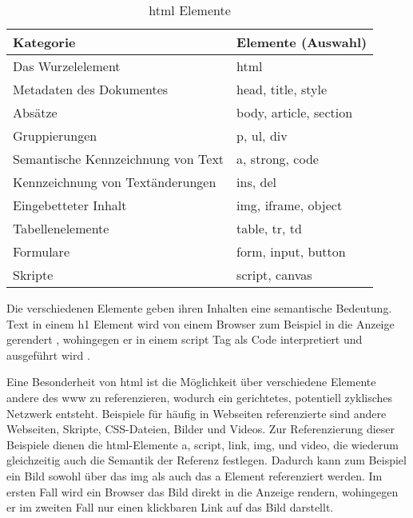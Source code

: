         \begin{table}[h]
            \centering
            \begin{tabular}{|l|l|}
            \hline
            \textbf{Kategorie} & \textbf{Elemente (Auswahl)} \\
            \hline
            Das Wurzelelement & html \\
            \hline
            Metadaten des Dokumentes & head, title, style \\
            \hline
            Absätze & body, article, section \\
            \hline
            Gruppierungen & p, ul, div \\
            \hline
            Semantische Kennzeichnung von Text & a, strong, code \\
            \hline
            Kennzeichnung von Textänderungen & ins, del \\
            \hline
            Eingebetteter Inhalt & img, iframe, object \\
            \hline
            Tabellenelemente & table, tr, td \\
            \hline
            Formulare & form, input, button \\
            \hline
            Skripte & script, canvas \\
            \hline
            \end{tabular}
            \caption{\gls{html} Elemente}
            \label{table:htmlElements}
        \end{table}

        Die verschiedenen Elemente geben ihren Inhalten eine semantische Bedeutung.
        Text in einem h1 Element wird von einem Browser zum Beispiel in die Anzeige gerendert
        \cite[Kapitel 4.3.6]{w3c:html5},
        wohingegen er in einem script Tag als Code interpretiert und ausgeführt wird
        \cite[Kapitel 4.11.1]{w3c:html5}.
        
        Eine Besonderheit von \gls{html} ist die Möglichkeit
        über verschiedene Elemente andere {\resources} des \gls{www} zu referenzieren,
        wodurch ein gerichtetes, potentiell zyklisches Netzwerk entsteht.
        Beispiele für häufig in Webseiten referenzierte {\resources}
        sind andere Webseiten, Skripte, CSS-Dateien, Bilder und Videos.
        Zur Referenzierung dieser Beispiele dienen die \gls{html}-Elemente
        a, script, link, img, und video,
        die wiederum gleichzeitig auch die Semantik der Referenz festlegen.
        Dadurch kann zum Beispiel ein Bild sowohl über das img
        als auch das a Element referenziert werden.
        Im ersten Fall wird ein Browser das Bild direkt in die Anzeige rendern,
        wohingegen er im zweiten Fall nur einen klickbaren Link auf das Bild darstellt.

